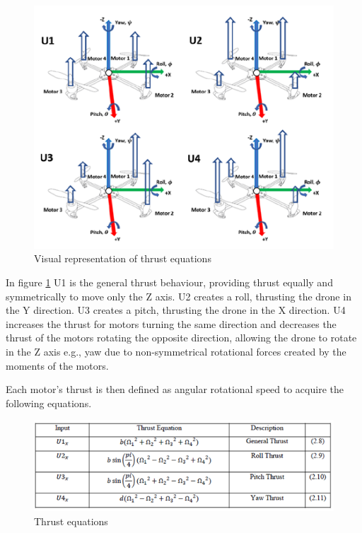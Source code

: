 \begin{figure}[H]
\begin{center}
   \includegraphics[scale =1]{pictures/control/thrust equations results.png}
\end{center}
\caption{Visual representation of thrust equations \cite{Ferry}}
\label{ter}
\end{figure}

In figure \ref{ter} U1 is the general thrust behaviour, providing thrust equally and symmetrically to move only the Z axis. U2 creates a roll, thrusting the drone in the Y direction. U3 creates a pitch, thrusting the drone in the X direction. U4 increases the thrust for motors turning the same direction and decreases the thrust of the motors rotating the opposite direction, allowing the drone to rotate in the Z axis e.g., yaw due to non-symmetrical rotational forces created by the moments of the motors.  \cite{Ferry}

Each motor's thrust is then defined as angular rotational speed to acquire the following equations.

\begin{figure}[H]
\begin{center}
   \includegraphics[scale =1]{pictures/control/thrust equations.png}
   
\end{center}
\caption{Thrust equations \cite{Ferry}}
\end{figure}

